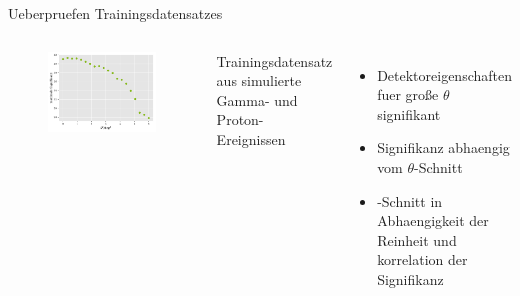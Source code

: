 \documentclass[aspectratio=1610, professionalfonts, 9pt]{beamer}
\begin{document}
\begin{frame}{Ueberpruefen Trainingsdatensatzes}
  \begin{columns}[onlytextwidth]
	\begin{figure}
	  \centering
	  \includegraphics[width=\textwidth]{./Plots/corr_sig_theta2.pdf}
	\end{figure}
	Trainingsdatensatz aus simulierte Gamma- und Proton-Ereignissen
	\begin{itemize}
	  \item Detektoreigenschaften fuer große $\theta$ signifikant
	  \item Signifikanz abhaengig vom $\theta$-Schnitt
	  \item \theta-Schnitt in Abhaengigkeit der Reinheit und korrelation der Signifikanz
	\end{itemize}
  \end{columns}
\end{frame}
\end{document}
